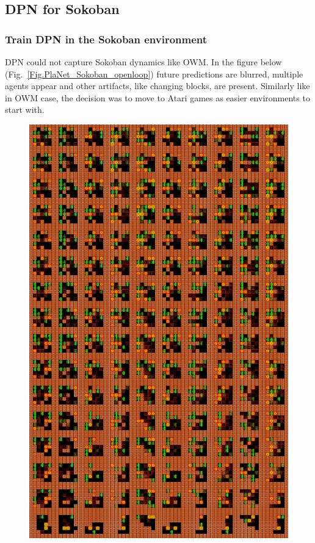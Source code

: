 \subsection{DPN for Sokoban}

\subsubsection{Train DPN in the Sokoban environment}

DPN could not capture Sokoban dynamics like OWM. In the figure below (Fig.~\ref{Fig.PlaNet_Sokoban_openloop}) future predictions are blurred, multiple agents appear and other artifacts, like changing blocks, are present. Similarly like in OWM case, the decision was to move to Atari games as easier environments to start with.

\begin{figure}[H]
\includegraphics[width=1\textwidth,keepaspectratio]{figures/PlaNet/Sokoban_memory.png}

\end{figure}
